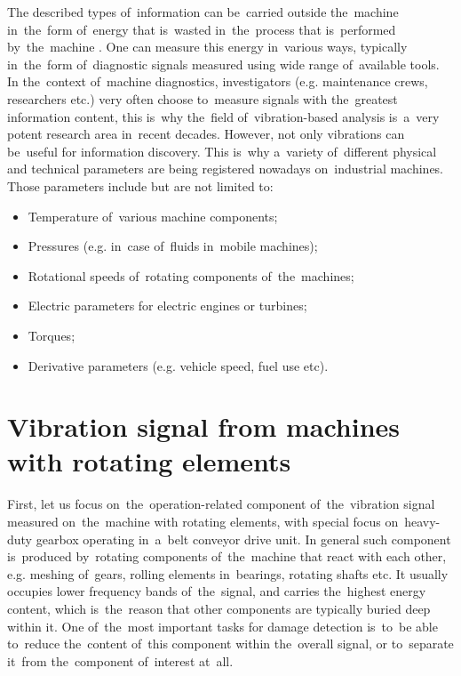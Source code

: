 The described types of~information can be~carried outside the~machine in~the~form of~energy that is~wasted in~the~process that is~performed by~the~machine \cite{cempel2003holistyczne}. One can measure this energy in~various ways, typically in~the~form of~diagnostic signals measured using wide range of~available tools. In the~context of~machine diagnostics, investigators (e.g. maintenance crews, researchers etc.) very often choose to~measure signals with the~greatest information content, this is~why the~field of~vibration-based analysis is~a~very potent research area in~recent decades. However, not only vibrations can be~useful for information discovery. This is~why a~variety of~different physical and technical parameters are being registered nowadays on~industrial machines. Those parameters include but are not limited to:

\begin{itemize}
  \item Temperature of~various machine components;
  \item Pressures (e.g. in~case of~fluids in~mobile machines);
  \item Rotational speeds of~rotating components of~the~machines;
  \item Electric parameters for electric engines or turbines;
  \item Torques;
  \item Derivative parameters (e.g. vehicle speed, fuel use etc).
\end{itemize}



\section{Vibration signal from machines with rotating elements}

First, let us focus on~the~operation-related component of~the~vibration signal measured on~the~machine with rotating elements, with special focus on~heavy-duty gearbox operating in~a~belt conveyor drive unit. In general such component is~produced by~rotating components of~the~machine that react with each other, e.g. meshing of~gears, rolling elements in~bearings, rotating shafts etc. It usually occupies lower frequency bands of~the~signal, and carries the~highest energy content, which is~the~reason that other components are typically buried deep within it. One of~the~most important tasks for damage detection is~to~be able to~reduce the~content of~this component within the~overall signal, or to~separate it~from the~component of~interest at~all. 

